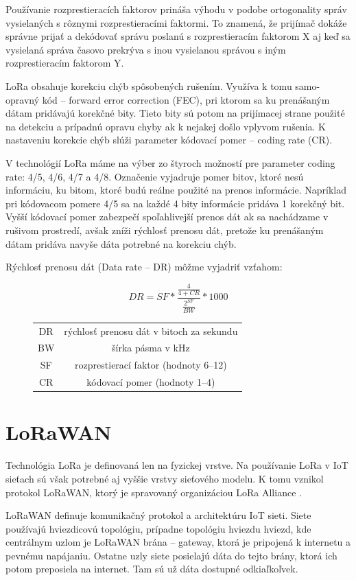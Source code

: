 \documentclass[slovak,master]{diploma}
\begin{document}
Používanie rozprestieracích faktorov prináša výhodu v podobe ortogonality správ vysielaných s rôznymi rozprestieracími faktormi. 
To znamená, že prijímač dokáže správne prijať a dekódovať správu poslanú s rozprestieracím faktorom X aj 
keď sa vysielaná správa časovo prekrýva s inou vysielanou správou s iným rozprestieracím faktorom Y.

LoRa obsahuje korekciu chýb spôsobených rušením. Využíva k tomu samo-opravný kód -- forward error correction (FEC), pri ktorom 
sa ku prenášaným dátam pridávajú korekčné bity. Tieto bity sú potom na prijímacej strane použité na detekciu a prípadnú opravu chyby ak k nejakej došlo vplyvom rušenia.
K nastaveniu korekcie chýb slúži parameter kódovací pomer -- coding rate (CR).

V technológií LoRa máme na výber zo štyroch možností pre parameter coding rate: 4/5, 4/6, 4/7 a 4/8. 
Označenie vyjadruje pomer bitov, ktoré nesú informáciu, ku bitom, ktoré budú reálne použité na prenos informácie. 
Napríklad pri kódovacom pomere 4/5 sa na každé 4 bity informácie pridáva 1 korekčný bit.
Vyšší kódovací pomer zabezpečí spoľahlivejší prenos dát ak sa nachádzame v rušivom prostredí, avšak zníži rýchlosť prenosu dát, 
pretože ku prenášaným dátam pridáva navyše dáta potrebné na korekciu chýb.

Rýchlosť prenosu dát (Data rate -- DR) môžme vyjadriť vzťahom:
\begin{figure}[h!]
  \centering
  \[DR = SF * \frac{\frac{4}{4+CR}}{\frac{2^{SF}}{BW}} *1000 \]
  \begin{tabular}{c c}
    DR & rýchlosť prenosu dát v bitoch za sekundu\\
    BW & šírka pásma v kHz \\
    SF & rozprestierací faktor (hodnoty 6--12) \\
    CR & kódovací pomer (hodnoty 1--4) \\
  \end{tabular}
\end{figure}

\section{LoRaWAN}
Technológia LoRa je definovaná len na fyzickej vrstve. Na používanie LoRa v IoT sieťach sú však potrebné aj vyššie vrstvy sieťového modelu.
K tomu vznikol protokol LoRaWAN, ktorý je spravovaný organizáciou LoRa Alliance \cite{lora}.

LoRaWAN definuje komunikačný protokol a architektúru IoT sieti. Siete používajú hviezdicovú topológiu, prípadne topológiu hviezdu hviezd, kde 
centrálnym uzlom je LoRaWAN brána -- gateway, ktorá je pripojená k internetu a pevnému napájaniu. Ostatne uzly siete posielajú dáta do tejto brány, 
ktorá ich potom preposiela na internet. Tam sú už dáta dostupné odkiaľkoľvek.
\end{document}
